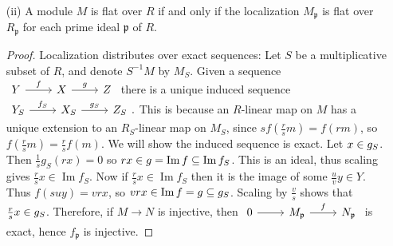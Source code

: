 \documentclass[10pt]{article}
\newcommand{\p}{\mathfrak{p}}
\DeclareMathOperator*{\im}{Im}
\let\ker\relax
\DeclareMathOperator*{\ker}{Ker}
\renewcommand{\bar}{\overline}
\begin{document}
\begin{enumerate}
\begin{enumerate}
\item[(ii)] A module $M$ is flat over $R$ if and only if the localization $M_\p$ is flat over $R_\p$ for each prime ideal $\p$ of $R$.

\begin{proof}
\begin{comment}
If $M$ and $L$ are a $R$-modules and $N$ is an $R_\p$-module, then an $R$-bilinear map $g : M \times N \rightarrow L$ has a natural extension to an $R_\p$-bilinear map $g_\p : M_\p \times N \rightarrow L$ given by $g_\p(\frac{r}{s}m,n) = \frac{r}{s}g(m,n)$ (linearity in the second component comes from the fact that $sg(m,\frac{r}{s}n) = rg(m,n)$ after dividing through by $s$).  Thus, if $m \otimes n = 0$ is nonzero in $M \otimes_R N$, then it must also be nonzero in $M_\p \otimes_{R_\p} N$.  This is because there is a bilinear map $M \times N \rightarrow L$ which does not take $(m,n)$ to 0, hence neither does the extension $g_\p$.

Suppose that $M$ is flat over $R$, and let $f:X \rightarrow Y$ be injective for some $R_\p$ modules $X,Y$.  Suppose that the induced map $\bar{f} : M_\p \otimes_{R_\p} X \rightarrow M_\p \otimes_{R_\p} Y$ takes $\frac{r}{s}m \otimes x$ to $0$ for some $m \in M$.  Then $\frac{r}{s}m \otimes f(x) = 0$, so $rm \otimes f(x) = 0$.  By the previous paragraph, $rm \otimes f(x)$ must also be zero in $M \otimes_R Y$.  Since $M$ is flat, we know $rm \otimes x = 0$, hence so is $\frac{r}{s}m \otimes x$.  So $\bar{f}
$ is injective, thus $M_\p$ is flat over $R_\p$.
\end{comment}

Localization distributes over exact sequences: Let $S$ be a multiplicative subset of $R$, and denote $S^{-1}M$ by $M_S$.  Given a sequence
$
\begin{tikzcd}
Y \arrow[r,"f"] & X \arrow[r,"g"] & Z
\end{tikzcd}
$
there is a unique induced sequence
$
\begin{tikzcd}
Y_S \arrow[r,"f_S"] & X_S \arrow[r,"g_S"] & Z_S
\end{tikzcd}.
$
This is because an $R$-linear map on $M$ has a unique extension to an $R_S$-linear map on $M_S$, since $sf(\frac{r}{s}m) = f(rm)$, so $f(\frac{r}{s}m) = \frac{r}{s}f(m)$.  We will show the induced sequence is exact.  Let $x \in \ker g_S$.  Then $\frac{1}{s}g_S(rx) = 0$ so $rx \in \ker g = \im f \subseteq \im f_S$.  This is an ideal, thus scaling gives $\frac{r}{s}x \in \im f_S$.  Now if $\frac{r}{s}x \in \im f_S$ then it is the image of some $\frac{u}{v}y \in Y$.  Thus $f(suy) = vrx$, so $vrx \in \im f = \ker g \subseteq \ker g_S$.  Scaling by $\frac{v}{s}$ shows that $\frac{r}{s}x \in \ker g_S$.  Therefore, if $M \rightarrow N$ is injective, then
$
\begin{tikzcd}
0 \arrow[r] & M_\p \arrow[r,"f"] & N_\p
\end{tikzcd}
$
is exact, hence $f_\p$ is injective.


\end{proof}
\end{enumerate}
\end{enumerate}
\end{document}
